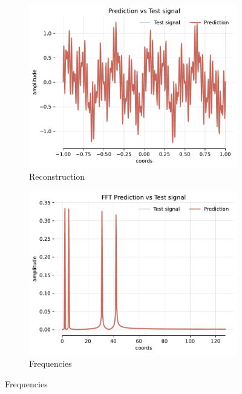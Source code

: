\begin{figure}[h]
    \centering
    \begin{subfigure}[b]{0.4\textwidth}
        \centering
        \includegraphics[width=\textwidth]{img/ch4/prediction_1hl_64hf_w10.pdf}
        \caption{Reconstruction}
        \label{fig:rec-freqs-1hl}
    \end{subfigure}
    \begin{subfigure}[b]{0.4\textwidth}
        \centering
        \includegraphics[width=\textwidth]{img/ch4/fft_1hl_64hf_w10.pdf}
        \caption{Frequencies}
        \label{fig:fft-freqs-1hl}
    \end{subfigure}
    

\end{figure}
